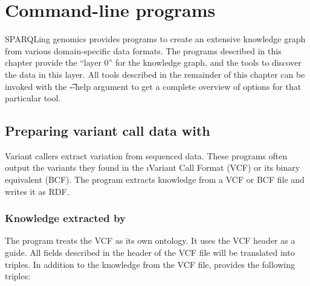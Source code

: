 \chapter{Command-line programs}
\label{chap:command-line}

  SPARQLing genomics provides programs to create an extensive knowledge graph
  from various domain-specific data formats.  The programs described in this
  chapter provide the ``layer 0'' for the knowledge graph, and the tools to
  discover the data in this layer.   All tools described in the remainder of
  this chapter can be invoked with the \t{-{}-help} argument to get a
  complete overview of options for that particular tool.

\section{Preparing variant call data with }
\label{sec:vcf2rdf}

  Variant callers extract variation from sequenced data.  These programs
  often output the variants they found in the \i{Variant Call Format}
  (VCF) or its binary equivalent (BCF).  The  program
  extracts knowledge from a VCF or BCF file and writes it as RDF.

\subsection{Knowledge extracted by }

  The program treats the VCF as its own ontology.  It uses the VCF header as
  a guide.  All fields described in the header of the VCF file will be
  translated into triples.  In addition to the knowledge from the VCF file,
   provides the following triples:

